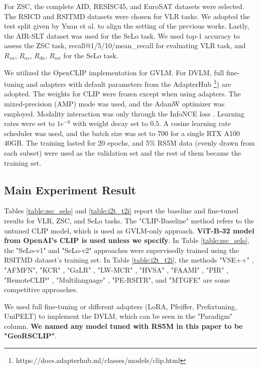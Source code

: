 \documentclass[journal]{IEEEtran}
\begin{document}
For ZSC, the complete AID\cite{aid}, RESISC45\cite{RESISC45}, and EuroSAT\cite{eurosat} datasets were selected. The RSICD and RSITMD datasets were chosen for VLR tasks. We adopted the test split given by Yuan et al. \cite{RSITMD} to align the setting of the previous works. Lastly, the AIR-SLT dataset was used for the SeLo task. We used top-1 accuracy to assess the ZSC task, recall@1/5/10/mean\_recall for evaluating VLR task, and $R_{su}$, $R_{as}$, $R_{da}$, $R_{mi}$ for the SeLo task. 


We utilized the OpenCLIP implementation for GVLM. For DVLM, full fine-tuning and adapters with default parameters from the AdapterHub \footnote{https://docs.adapterhub.ml/classes/models/clip.html}) are adopted. The weights for CLIP were frozen except when using adapters. The mixed-precision (AMP) mode was used, and the AdamW optimizer \cite{adamw} was employed. Modality interaction was only through the InfoNCE loss \cite{infonce}. Learning rates were set to $1e^{-6}$ with weight decay set to $0.5$. A cosine learning rate scheduler was used, and the batch size was set to 700 for a single RTX A100 40GB. The training lasted for 20 epochs, and 5\% RS5M data (evenly drawn from each subset) were used as the validation set and the rest of them became the training set.

\subsection{Main Experiment Result}

Tables \ref{table:zsc_selo}  and \ref{table:i2t_t2i} report the baseline and fine-tuned results for VLR, ZSC, and SeLo tasks. The "CLIP-Baseline" method refers to the untuned CLIP model, which is used as GVLM-only approach. \textbf{ViT-B-32 model from OpenAI's CLIP is used unless we specify}. In Table \ref{table:zsc_selo}, the "SeLo-v1" \cite{selo} and "SeLo-v2" \cite{selov2} approaches were supervisedly trained using the RSITMD dataset's training set. In Table \ref{table:i2t_t2i}, the methods "VSE++" \cite{vse++}, "AFMFN"\cite{RSITMD}, "KCR" \cite{kcr}, "GaLR" \cite{galr}, "LW-MCR" \cite{LW-MCR}, "HVSA" \cite{hvsa}, "FAAMI" \cite{Zheng_2023}, "PIR" \cite{pir}, "RemoteCLIP" \cite{liu2023remoteclip}, "Multilanguage" \cite{multilingual}, "PE-RSITR"\cite{yuan2023parameterefficient}, and "MTGFE"\cite{MTGFE} are some competitive approaches. 

We used full fine-tuning or different adapters (LoRA, Pfeiffer, Prefixtuning, UniPELT) to implement the DVLM, which can be seen in the "Paradigm" column. \textbf{We named any model tuned with RS5M in this paper to be "GeoRSCLIP"}. 
\end{document}
